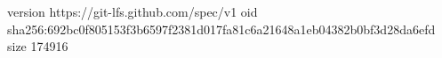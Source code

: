 version https://git-lfs.github.com/spec/v1
oid sha256:692bc0f805153f3b6597f2381d017fa81c6a21648a1eb04382b0bf3d28da6efd
size 174916
